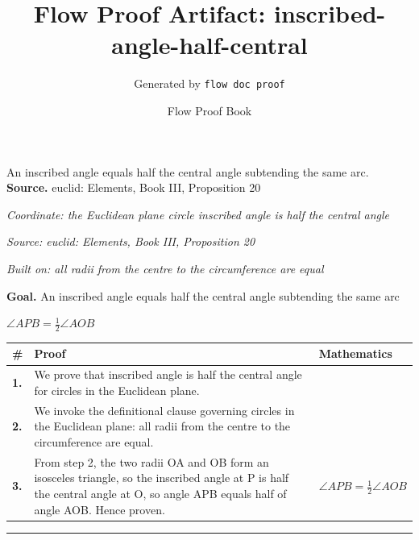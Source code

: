 \documentclass[11pt]{article}
\title{Flow Proof Artifact: inscribed-angle-half-central}
\author{Generated by \texttt{flow doc proof}}
\date{Flow Proof Book}
\theoremstyle{definition}
\begin{document}
\maketitle
An inscribed angle equals half the central angle subtending the same arc.\\[0.5em]
\textbf{Source.} euclid: Elements, Book III, Proposition 20\\[0.5em]
\bigskip
{}\par
\smallskip\noindent\textit{Coordinate: the Euclidean plane \cdot circle \cdot inscribed angle is half the central angle}\par
\smallskip\noindent\textit{Source: euclid: Elements, Book III, Proposition 20}\par
\smallskip\noindent\textit{Built on: all radii from the centre to the circumference are equal}\par
\medskip
\noindent\textbf{Goal.} An inscribed angle equals half the central angle subtending the same arc\par
\noindent$\displaystyle \angle APB = \tfrac{1}{2}\angle AOB$\par
\medskip
\noindent
\begin{tabular}{@{} >{\raggedright\arraybackslash}p{} >{\raggedright\arraybackslash}p{} >{\raggedleft\arraybackslash}p{} @{}}
\textbf{\#} & \textbf{Proof} & \textbf{Mathematics} \\
\midrule
\textbf{1.} & We prove that inscribed angle is half the central angle for circles in the Euclidean plane. & \\[0.45em]
\textbf{2.} & We invoke the definitional clause governing circles in the Euclidean plane: all radii from the centre to the circumference are equal. & \\[0.45em]
\textbf{3.} & From step 2, the two radii OA and OB form an isosceles triangle, so the inscribed angle at P is half the central angle at O, so angle APB equals half of angle AOB. Hence proven. & $\displaystyle \angle APB = \tfrac{1}{2}\angle AOB$ \\[0.45em]
\bottomrule
\end{tabular}
\label{thm:Geometry-circle-inscribed_angle_is_half_the_central_angle}
\par\medskip\hrule
\end{document}
